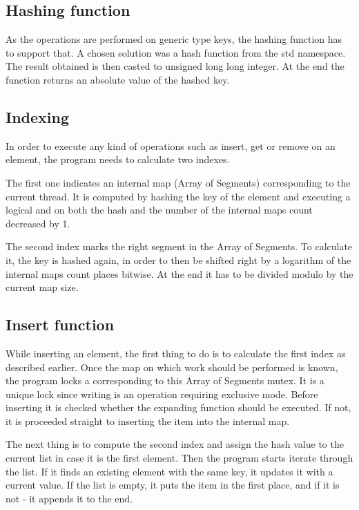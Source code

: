 \subsection{Hashing function}
    As the operations are performed on generic type keys, the hashing function has to support that. A chosen solution was a hash function from the std namespace. The result obtained is then casted to unsigned long long integer. At the end the function returns an absolute value of the hashed key.
    
\subsection{Indexing }
    In order to execute any kind of operations such as insert, get or remove on an element, the program needs to calculate two indexes. 
    
    The first one indicates an internal map (Array of Segments) corresponding to the current thread. It is computed by hashing the key of the element and executing a logical and on both the hash and the number of the internal maps count decreased by 1. 
    
    The second index marks the right segment in the Array of Segments. To calculate it, the key is hashed again, in order to then be shifted right by a logarithm of the internal maps count places bitwise. At the end it has to be divided modulo by the current map size.

    
\subsection{Insert function}
    While inserting an element, the first thing to do is to calculate the first index as described earlier. Once the map on which work should be performed is known, the program locks a corresponding to this Array of Segments mutex. It is a unique lock since writing is an operation requiring exclusive mode. Before inserting it is checked whether the expanding function should be executed. If not, it is proceeded straight to inserting the item into the internal map.
        
    The next thing is to compute the second index and assign the hash value to the current list in case it is the first element. Then the program starts iterate through the list. If it finds an existing element with the same key, it updates it with a current value. If the list is empty, it puts the item in the first place, and if it is not - it appends it to the end.
        
